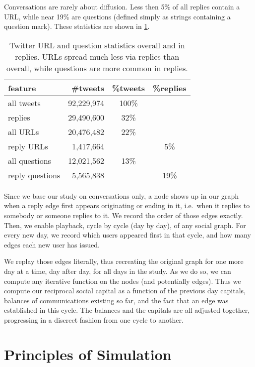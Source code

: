\documentclass[10pt,oneside]{memoir}
\begin{document}
Conversations are rarely about diffusion.  Less then 5\% of all replies contain a URL, while near 19\% are questions (defined simply as strings containing a question mark).  These statistics are shown in \ref{table:reply-stats}.



\begin{table}
\begin{tabular}{|lrcc|}
\toprule
feature & \#tweets & \%tweets & \%replies \\
\midrule
all tweets & 92,229,974 & 100\% & \space\\
replies & 29,490,600 & 32\% & \space \\
all URLs & 20,476,482 &  22\% & \space \\
reply URLs & 1,417,664 & \space & 5\% \\
all questions & 12,021,562 & 13\% & \space \\
reply questions & 5,565,838 & \space & 19\% \\
\bottomrule
\end{tabular}
\label{table:reply-stats}
\caption{Twitter URL and question statistics overall and in replies.  URLs spread much less via replies than overall, while questions are more common in replies.}
\end{table}
Since we base our study on conversations only, a node shows up in our graph when a reply edge first appears originating or ending in it, i.e.\ when it replies to somebody or someone replies to it.  We record the order of those edges exactly.
Then, we enable playback, cycle by cycle (day by day), of any social graph.  For every new day, we record which users appeared first in that cycle, and how many edges each new user has issued.


We replay those edges literally, thus recreating the original graph for one more day at a time, day after day, for all days in the study.  As we do so, we can compute any iterative function on the nodes (and potentially edges).  Thus we compute our reciprocal social capital as a function of the previous day capitals, balances of communications existing so far, and the fact that an edge was established in this cycle.  The balances and the capitals are all adjusted together, progressing in a discreet fashion from one cycle to another.


\pagebreak \section{Principles of Simulation}
\label{principlesofsimulation}
\end{document}
